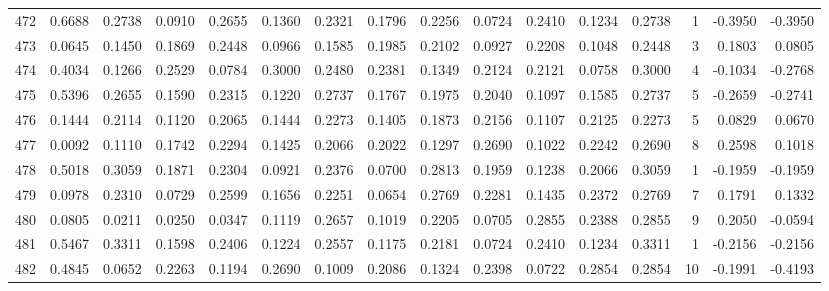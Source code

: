 \begin{tabular}{lrrrrrrrrrrrrrrr}
472 &      0.6688 &  0.2738 &  0.0910 &  0.2655 &  0.1360 &  0.2321 &  0.1796 &  0.2256 &  0.0724 &  0.2410 &   0.1234 &     0.2738 &      1 &                   -0.3950 &                    -0.3950 \\
473 &      0.0645 &  0.1450 &  0.1869 &  0.2448 &  0.0966 &  0.1585 &  0.1985 &  0.2102 &  0.0927 &  0.2208 &   0.1048 &     0.2448 &      3 &                    0.1803 &                     0.0805 \\
474 &      0.4034 &  0.1266 &  0.2529 &  0.0784 &  0.3000 &  0.2480 &  0.2381 &  0.1349 &  0.2124 &  0.2121 &   0.0758 &     0.3000 &      4 &                   -0.1034 &                    -0.2768 \\
475 &      0.5396 &  0.2655 &  0.1590 &  0.2315 &  0.1220 &  0.2737 &  0.1767 &  0.1975 &  0.2040 &  0.1097 &   0.1585 &     0.2737 &      5 &                   -0.2659 &                    -0.2741 \\
476 &      0.1444 &  0.2114 &  0.1120 &  0.2065 &  0.1444 &  0.2273 &  0.1405 &  0.1873 &  0.2156 &  0.1107 &   0.2125 &     0.2273 &      5 &                    0.0829 &                     0.0670 \\
477 &      0.0092 &  0.1110 &  0.1742 &  0.2294 &  0.1425 &  0.2066 &  0.2022 &  0.1297 &  0.2690 &  0.1022 &   0.2242 &     0.2690 &      8 &                    0.2598 &                     0.1018 \\
478 &      0.5018 &  0.3059 &  0.1871 &  0.2304 &  0.0921 &  0.2376 &  0.0700 &  0.2813 &  0.1959 &  0.1238 &   0.2066 &     0.3059 &      1 &                   -0.1959 &                    -0.1959 \\
479 &      0.0978 &  0.2310 &  0.0729 &  0.2599 &  0.1656 &  0.2251 &  0.0654 &  0.2769 &  0.2281 &  0.1435 &   0.2372 &     0.2769 &      7 &                    0.1791 &                     0.1332 \\
480 &      0.0805 &  0.0211 &  0.0250 &  0.0347 &  0.1119 &  0.2657 &  0.1019 &  0.2205 &  0.0705 &  0.2855 &   0.2388 &     0.2855 &      9 &                    0.2050 &                    -0.0594 \\
481 &      0.5467 &  0.3311 &  0.1598 &  0.2406 &  0.1224 &  0.2557 &  0.1175 &  0.2181 &  0.0724 &  0.2410 &   0.1234 &     0.3311 &      1 &                   -0.2156 &                    -0.2156 \\
482 &      0.4845 &  0.0652 &  0.2263 &  0.1194 &  0.2690 &  0.1009 &  0.2086 &  0.1324 &  0.2398 &  0.0722 &   0.2854 &     0.2854 &     10 &                   -0.1991 &                    -0.4193 \\

\end{tabular}

